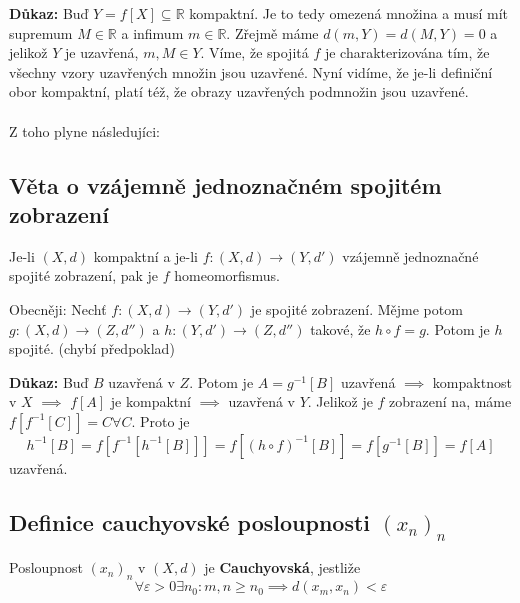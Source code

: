 \documentclass[../main.tex]{subfiles}
\begin{document}
\vspace{5mm}
\noindent
\textbf{Důkaz:} Buď $Y = f[X] \subseteq \mathbb{R}$ kompaktní. Je to tedy omezená množina a musí mít supremum $M\in \mathbb{R}$ a infimum $m\in \mathbb{R}$. Zřejmě máme 
$d(m,Y) = d(M,Y) = 0$ a jelikož $Y$ je uzavřená, $m,M \in Y$. Víme, že spojitá $f$ je charakterizována tím, že všechny vzory uzavřených množin
jsou uzavřené. Nyní vidíme, že je-li definiční obor kompaktní, platí též, že obrazy uzavřených podmnožin jsou uzavřené. 
\\
\\
Z toho plyne následujíci:

\subsection{Věta o vzájemně jednoznačném spojitém zobrazení}
\hspace{1.2mm}
\noindent
Je-li $(X,d)$ kompaktní a je-li $f: (X,d) \to (Y,d')$ vzájemně jednoznačné spojité zobrazení, pak je
$f$ homeomorfismus.

\vspace{2mm}
\hspace{1.2mm}
{\small
Obecněji: Nechť $f:(X,d) \to (Y,d')$ je spojité zobrazení. Mějme potom $g: (X,d) \to (Z, d'')$ a
$h: (Y,d') \to (Z,d'')$ takové, že $h \circ f = g$. Potom je $h$ spojité. (chybí předpoklad)}

\vspace{5mm}
\noindent
\textbf{Důkaz:} Buď $B$ uzavřená v $Z$. Potom je $A = g^{-1}[B]$ uzavřená $\implies$ kompaktnost v $X$ $\implies$ $f[A]$ je kompaktní $\implies$ uzavřená v $Y$. Jelikož  je $f$ zobrazení na, máme $f[f^{-1}[C]] = C \forall C$. Proto je 
\[h^{-1}[B] = f[f^{-1}[h^{-1}[B]]] = f[(h \circ f)^{-1}[B]] = f[g^{-1}[B]] = f[A]\]
uzavřená.

\subsection{Definice cauchyovské posloupnosti $(x_n)_n$}
\hspace{1.2mm}
\noindent
Posloupnost $(x_n)_n$ v $(X,d)$ je \textbf{Cauchyovská}, jestliže
\[ \forall \varepsilon > 0 \exists n_0: m,n \geq n_0 \implies d(x_m, x_n) < \varepsilon \]

\end{document}
